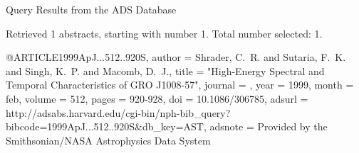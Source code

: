Query Results from the ADS Database


Retrieved 1 abstracts, starting with number 1.  Total number selected: 1.

@ARTICLE{1999ApJ...512..920S,
   author = {{Shrader}, C.~R. and {Sutaria}, F.~K. and {Singh}, K.~P. and 
	{Macomb}, D.~J.},
    title = "{High-Energy Spectral and Temporal Characteristics of GRO J1008-57}",
  journal = {\apj},
     year = 1999,
    month = feb,
   volume = 512,
    pages = {920-928},
      doi = {10.1086/306785},
   adsurl = {http://adsabs.harvard.edu/cgi-bin/nph-bib_query?bibcode=1999ApJ...512..920S&db_key=AST},
  adsnote = {Provided by the Smithsonian/NASA Astrophysics Data System}
}


